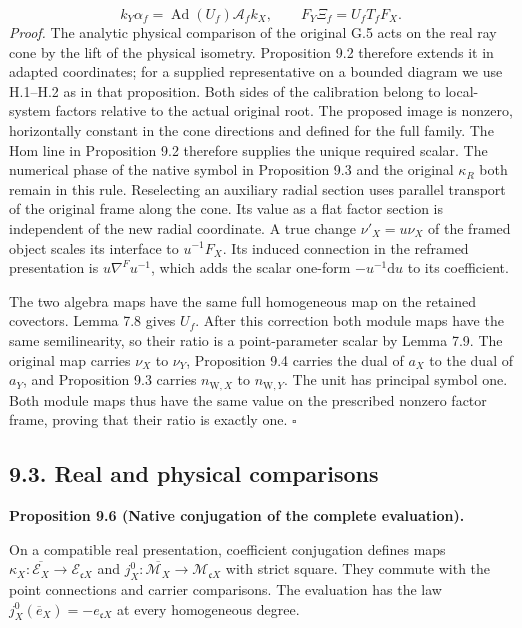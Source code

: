\documentclass[
  english,
  11pt,
  reqno]{amsart}
\makeatletter
\newcommand{\pandocstatementheading}[1]{%
  \par\addpenalty{\@beginparpenalty}%
  \addvspace{.5\baselineskip plus .2\baselineskip minus .2\baselineskip}%
  {\normalfont\bfseries #1\par}%
  \nobreak\@afterindenttrue\@afterheading
}
\makeatother
\begin{document}
\label{eq:analytic-physical-scalar-one} \[
k_Y\alpha_f=\operatorname{Ad}(U_f)\mathcal A_f k_X,\qquad
F_Y\Xi_f=U_f T_f F_X .
\] \emph{Proof.} The analytic physical comparison of the original G.5
acts on the real ray cone by the lift of the physical isometry.
Proposition 9.2 therefore extends it in adapted coordinates; for a
supplied representative on a bounded diagram we use H.1--H.2 as in that
proposition. Both sides of the calibration belong to local-system
factors relative to the actual original root. The proposed image is
nonzero, horizontally constant in the cone directions and defined for
the full family. The Hom line in Proposition 9.2 therefore supplies the
unique required scalar. The numerical phase of the native symbol in
Proposition 9.3 and the original \(\kappa_R\) both remain in this rule.
Reselecting an auxiliary radial section uses parallel transport of the
original frame along the cone. Its value as a flat factor section is
independent of the new radial coordinate. A true change
\(\nu'_X=u\nu_X\) of the framed object scales its interface to
\(u^{-1}F_X\). Its induced connection in the reframed presentation is
\(u\nabla^F u^{-1}\), which adds the scalar one-form
\(-u^{-1}\mathrm du\) to its coefficient.

The two algebra maps have the same full homogeneous map on the retained
covectors. Lemma 7.8 gives \(U_f\). After this correction both module
maps have the same semilinearity, so their ratio is a point-parameter
scalar by Lemma 7.9. The original map carries \(\nu_X\) to \(\nu_Y\),
Proposition 9.4 carries the dual of \(a_X\) to the dual of \(a_Y\), and
Proposition 9.3 carries \(n_{\mathrm W,X}\) to \(n_{\mathrm W,Y}\). The
unit has principal symbol one. Both module maps thus have the same value
on the prescribed nonzero factor frame, proving that their ratio is
exactly one. \hfill\(\square\)

\subsection{9.3. Real and physical
comparisons}\label{real-and-physical-comparisons}\label{sec:analytic-real-and-physical-maps}

\pandocstatementheading{\leavevmode{}\label{prop:analytic-native-real-parity}Proposition 9.6 (Native conjugation of the complete evaluation).}

On a compatible real presentation, coefficient conjugation defines maps
\(\kappa_X:\overline{\mathscr E_X}\to\mathscr E_{\mathfrak cX}\) and
\(j_X^0:\overline{\mathscr M_X}\to\mathscr M_{\mathfrak cX}\) with
strict square. They commute with the point connections and carrier
comparisons. The evaluation has the law
\(j_X^0(\overline e_X)=-e_{\mathfrak cX}\) at every homogeneous degree.
\end{document}
